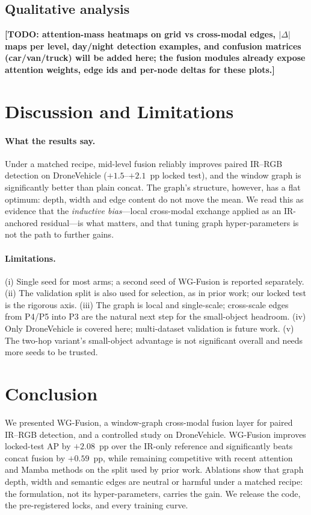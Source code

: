 \documentclass[10pt,twocolumn,letterpaper]{article}
\newcommand{\TODO}[1]{{\color{red}\textbf{[TODO: #1]}}}
\begin{document}
\subsection{Qualitative analysis}
\TODO{attention-mass heatmaps on grid vs cross-modal edges, $|\Delta|$ maps per
level, day/night detection examples, and confusion matrices (car/van/truck)
will be added here; the fusion modules already expose attention weights, edge
ids and per-node deltas for these plots.}

\section{Discussion and Limitations}
\paragraph{What the results say.}
Under a matched recipe, mid-level fusion reliably improves paired IR--RGB
detection on DroneVehicle ($+1.5$--$+2.1$~pp locked test), and the window graph
is significantly better than plain concat. The graph's structure, however, has
a flat optimum: depth, width and edge content do not move the mean. We read
this as evidence that the \emph{inductive bias}---local cross-modal exchange
applied as an IR-anchored residual---is what matters, and that tuning graph
hyper-parameters is not the path to further gains.

\paragraph{Limitations.}
(i) Single seed for most arms; a second seed of WG-Fusion is reported
separately. (ii) The validation split is also used for selection, as in prior
work; our locked test is the rigorous axis. (iii) The graph is local and
single-scale; cross-scale edges from P4/P5 into P3 are the natural next step
for the small-object headroom. (iv) Only DroneVehicle is covered here;
multi-dataset validation is future work. (v) The two-hop variant's small-object
advantage is not significant overall and needs more seeds to be trusted.

\section{Conclusion}
We presented WG-Fusion, a window-graph cross-modal fusion layer for paired
IR--RGB detection, and a controlled study on DroneVehicle. WG-Fusion improves
locked-test AP by $+2.08$~pp over the IR-only reference and significantly
beats concat fusion by $+0.59$~pp, while remaining competitive with recent
attention and Mamba methods on the split used by prior work. Ablations show
that graph depth, width and semantic edges are neutral or harmful under a
matched recipe: the formulation, not its hyper-parameters, carries the gain.
We release the code, the pre-registered locks, and every training curve.

{\small


}
\end{document}
